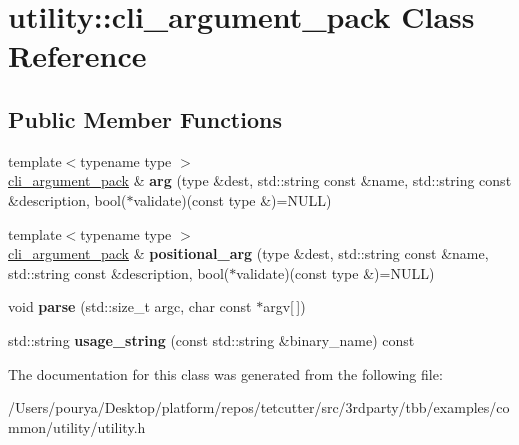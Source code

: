 \hypertarget{classutility_1_1cli__argument__pack}{}\section{utility\+:\+:cli\+\_\+argument\+\_\+pack Class Reference}
\label{classutility_1_1cli__argument__pack}
\subsection*{Public Member Functions}
\begin{DoxyCompactItemize}
\item 
\hypertarget{classutility_1_1cli__argument__pack_a54dbff378ae6fd9472e76fd69b5e77e8}{}{\footnotesize template$<$typename type $>$ }\\\hyperlink{classutility_1_1cli__argument__pack}{cli\+\_\+argument\+\_\+pack} \& {\bfseries arg} (type \&dest, std\+::string const \&name, std\+::string const \&description, bool($\ast$validate)(const type \&)=N\+U\+L\+L)\label{classutility_1_1cli__argument__pack_a54dbff378ae6fd9472e76fd69b5e77e8}

\item 
\hypertarget{classutility_1_1cli__argument__pack_acf226fa2ff64530dc074e8513bee1c39}{}{\footnotesize template$<$typename type $>$ }\\\hyperlink{classutility_1_1cli__argument__pack}{cli\+\_\+argument\+\_\+pack} \& {\bfseries positional\+\_\+arg} (type \&dest, std\+::string const \&name, std\+::string const \&description, bool($\ast$validate)(const type \&)=N\+U\+L\+L)\label{classutility_1_1cli__argument__pack_acf226fa2ff64530dc074e8513bee1c39}

\item 
\hypertarget{classutility_1_1cli__argument__pack_a2d2ad74e2412fe7a37caebd4344e72c4}{}void {\bfseries parse} (std\+::size\+\_\+t argc, char const $\ast$argv\mbox{[}$\,$\mbox{]})\label{classutility_1_1cli__argument__pack_a2d2ad74e2412fe7a37caebd4344e72c4}

\item 
\hypertarget{classutility_1_1cli__argument__pack_a49aa0e379bd8363b30f8cfa91976be7b}{}std\+::string {\bfseries usage\+\_\+string} (const std\+::string \&binary\+\_\+name) const \label{classutility_1_1cli__argument__pack_a49aa0e379bd8363b30f8cfa91976be7b}

\end{DoxyCompactItemize}


The documentation for this class was generated from the following file\+:\begin{DoxyCompactItemize}
\item 
/\+Users/pourya/\+Desktop/platform/repos/tetcutter/src/3rdparty/tbb/examples/common/utility/utility.\+h\end{DoxyCompactItemize}
